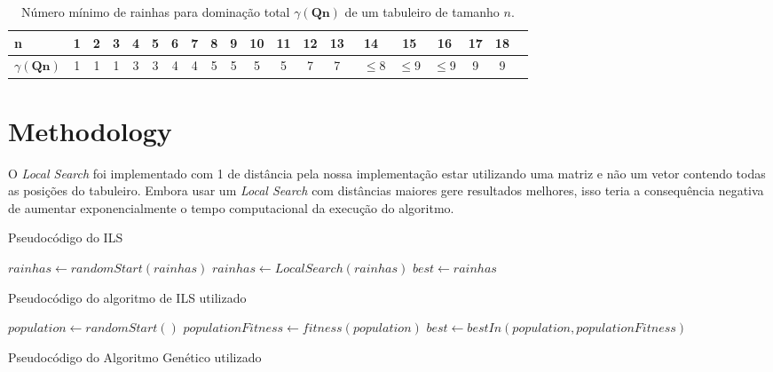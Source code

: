 \documentclass[
	article,			%
	11pt,				%
	oneside,			%
	a4paper,			%
	english,			%
	brazil,				%
	sumario=tradicional
	]{abntex2}
\begin{document}
\begin{table}[ht]
  \caption{Número mínimo de rainhas para dominação total $\gamma(\textbf{Qn})$ de um tabuleiro de tamanho $\textit{n}$.}
  \begin{tabular}{l*{18}{c}r}
    n              & 1 & 2 & 3 & 4 & 5  & 6 & 7 & 8 & 9 & 10 & 11 & 12 & 13 & 14 & 15 & 16 & 17 & 18 \\
    \hline
    $\gamma(\textbf{Qn})$ & 1 & 1 & 1 & 3 & 3 & 4 & 4 & 5 & 5 & 5 & 5 & 7 & 7 & ~$\leq$8 & $\leq$9 & $\leq$9  & 9 & 9 \\
  \end{tabular}
  \label{tabela1}
\end{table}


\section{Methodology}

O \textit{Local Search} foi implementado com 1 de distância pela nossa implementação estar utilizando uma matriz e não um vetor contendo todas as posições do tabuleiro. Embora usar um \textit{Local Search} com distâncias maiores gere resultados melhores, isso teria a consequência negativa de aumentar exponencialmente o tempo computacional da execução do algoritmo.

Pseudocódigo do ILS
\begin{algorithm}
  $rainhas \gets randomStart(rainhas)$\;
  $rainhas \gets Local Search(rainhas)$\;
  $best \gets rainhas$\;

  \caption{Pseudocódigo do algoritmo de ILS utilizado}
 \end{algorithm}

 \begin{algorithm}
  $population \gets randomStart()$\;
  $populationFitness \gets fitness(population)$\;
  $best \gets bestIn(population, populationFitness)$\;
  \caption{Pseudocódigo do Algoritmo Genético utilizado}
 \end{algorithm}
 
\end{document}
